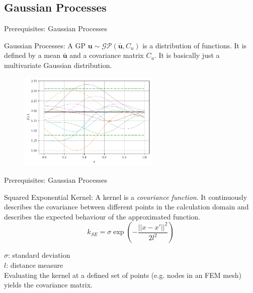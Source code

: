 \documentclass[fleqn,11pt,aspectratio=43]{beamer}
\begin{document}
\subsection{Gaussian Processes}
\begin{frame}{Prerequisites: Gaussian Processes}
\begin{block}{Gaussian Processes:}
A GP $\bm{u} \sim \mathcal{GP}(\bar{\bm{u}},C_u)$ is a distribution of functions. It is defined by a mean $\bar{\bm{u}}$ and a covariance matrix $C_u$. It is basically just a multivariate Gaussian distribution.

\end{block}
\begin{figure}[h]
\begin{center}
\includegraphics[width=0.6\textwidth]{sqexp_f_sampled}
\end{center}
\end{figure}

\end{frame}

\begin{frame}{Prerequisites: Gaussian Processes}
\begin{block}{Squared Exponential Kernel:}
A kernel is a \emph{covariance function}.  It continuously describes the covariance between different points in the calculation domain and describes the expected behaviour of the approximated function.
\begin{equation}
k_{SE} = \sigma \exp \left( -\frac{||x-x'||^2}{2l^2} \right)
\end{equation}
\end{block}
$\sigma$: standard deviation\\
$l$: distance measure\\
Evaluating the kernel at a defined set of points (e.g. nodes in an FEM mesh) yields the covariance matrix.
\end{frame}
\end{document}

